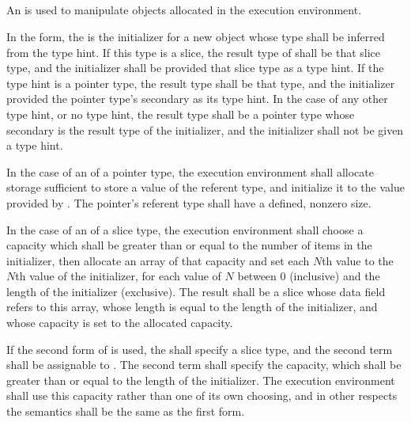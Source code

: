 \begin{grammar}
 \\
	 \terminal{(}  \terminal{)} \\
	 \terminal{(}  \terminal{,}  \terminal{)} \\
	 \terminal{(}  \terminal{)} \\
\end{grammar}

\specsubsubitem
An  is used to manipulate objects allocated
in the execution environment.

\specsubsubitem
In the  form, the  is the initializer
for a new object whose type shall be inferred from the type hint. If this type
is a slice, the result type of  shall be that slice type, and
the initializer shall be provided that slice type as a type hint. If the type
hint is a pointer type, the result type shall be that type, and the initializer
provided the pointer type's secondary as its type hint. In the case of any other
type hint, or no type hint, the result type shall be a pointer type whose
secondary is the result type of the initializer, and the initializer shall not
be given a type hint.

\specsubsubitem
In the case of an  of a pointer type, the execution environment
shall allocate storage sufficient to store a value of the referent type, and
initialize it to the value provided by . The pointer's
referent type shall have a defined, nonzero size.

\specsubsubitem
In the case of an  of a slice type, the execution environment
shall choose a capacity which shall be greater than or equal to the number of
items in the initializer, then allocate an array of that capacity and set each
$N$th value to the $N$th value of the initializer, for each value of $N$
between $0$ (inclusive) and the length of the initializer (exclusive).  The
result shall be a slice whose data field refers to this array, whose length is
equal to the length of the initializer, and whose capacity is set to the
allocated capacity.

\specsubsubitem
If the second form of  is used, the  shall
specify a slice type, and the second term shall be assignable to
.  The second term shall specify the capacity, which shall be
greater than or equal to the length of the initializer. The execution
environment shall use this capacity rather than one of its own choosing, and in
other respects the semantics shall be the same as the first form.

